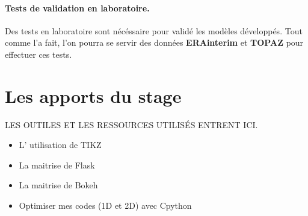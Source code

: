 \paragraph{Tests de validation en laboratoire.} Des tests en laboratoire sont nécéssaire pour validé les modèles développés. Tout comme \citeauthor{rabatel2015thesis} l'a fait, l'on pourra se servir des données \textbf{ERAinterim} et \textbf{TOPAZ} pour effectuer ces tests.














\section{Les apports du stage}

LES OUTILES ET LES RESSOURCES UTILISÉS ENTRENT ICI.





\begin{itemize}
   \item L' utilisation de TIKZ
   \item La maitrise de Flask
   \item La maitrise de Bokeh
\end{itemize}

\begin{itemize}
    \item Optimiser mes codes (1D et 2D) avec Cpython
\end{itemize}


